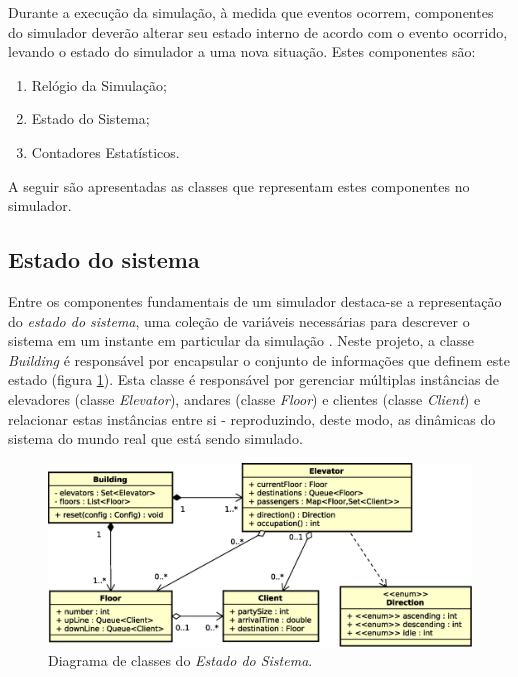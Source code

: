 Durante a execução da simulação, à medida que eventos ocorrem, componentes do
simulador deverão alterar seu estado interno de acordo com o evento ocorrido,
levando o estado do simulador a uma nova situação. Estes componentes são:

\begin{enumerate}
  \item Relógio da Simulação;
  \item Estado do Sistema;
  \item Contadores Estatísticos.
\end{enumerate}

A seguir são apresentadas as classes que representam estes componentes no
simulador.

\subsection{Estado do sistema}

Entre os componentes fundamentais de um simulador destaca-se a representação do
\textit{estado do sistema}, uma coleção de variáveis necessárias para descrever
o sistema em um instante em particular da simulação \cite{Law}. Neste projeto, a
classe \textit{Building} é responsável por encapsular o conjunto de informações
que definem este estado (figura \ref{fig:diagram:model}). Esta classe é
responsável por gerenciar múltiplas instâncias de elevadores (classe
\textit{Elevator}), andares (classe \textit{Floor}) e clientes (classe
\textit{Client}) e relacionar estas instâncias entre si - reproduzindo, deste
modo, as dinâmicas do sistema do mundo real que está sendo simulado.

\begin{figure}[htb!]
  \centering
  \includegraphics[scale=0.6]{img/Model.eps}
  \caption{Diagrama de classes do \textit{Estado do Sistema}.}
\label{fig:diagram:model}
\end{figure}

